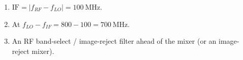 \begin{enumerate}[leftmargin=1.6em,itemsep=2pt]
\item $\text{IF} = |f_{RF} - f_{LO}| = 100\ \text{MHz}$.
\item At $f_{LO} - f_{IF} = 800 - 100 = 700\ \text{MHz}$.
\item An RF band-select / image-reject filter ahead of the mixer (or an image-reject mixer).
\end{enumerate}

